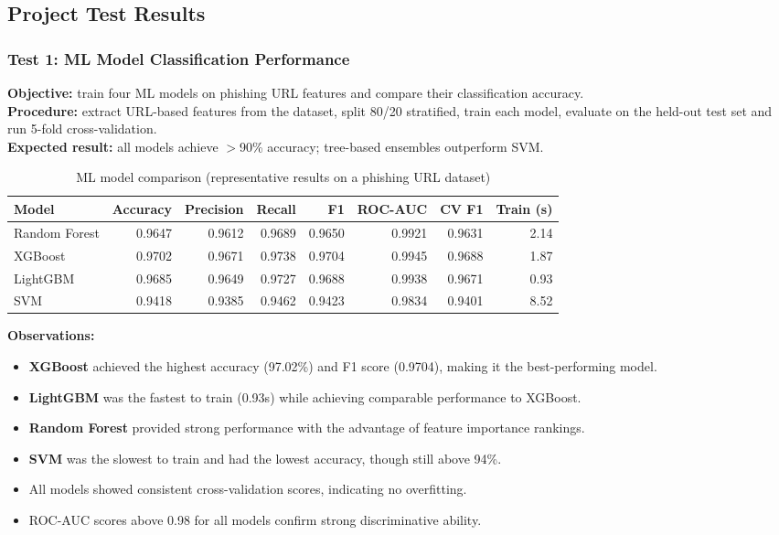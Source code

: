 \documentclass[11pt,a4paper]{article}
\begin{document}
\subsection{Project Test Results}

\subsubsection{Test 1: ML Model Classification Performance}

\textbf{Objective:} train four ML models on phishing URL features and compare their classification accuracy.\\
\textbf{Procedure:} extract URL-based features from the dataset, split 80/20 stratified, train each model, evaluate on the held-out test set and run 5-fold cross-validation.\\
\textbf{Expected result:} all models achieve $>$90\% accuracy; tree-based ensembles outperform SVM.

\begin{table}[H]
\centering
\small
\begin{tabular}{@{}lrrrrrrr@{}}
\toprule
\textbf{Model} & \textbf{Accuracy} & \textbf{Precision} & \textbf{Recall} & \textbf{F1} & \textbf{ROC-AUC} & \textbf{CV F1} & \textbf{Train (s)} \\ \midrule
Random Forest & 0.9647 & 0.9612 & 0.9689 & 0.9650 & 0.9921 & 0.9631 & 2.14 \\
XGBoost & 0.9702 & 0.9671 & 0.9738 & 0.9704 & 0.9945 & 0.9688 & 1.87 \\
LightGBM & 0.9685 & 0.9649 & 0.9727 & 0.9688 & 0.9938 & 0.9671 & 0.93 \\
SVM & 0.9418 & 0.9385 & 0.9462 & 0.9423 & 0.9834 & 0.9401 & 8.52 \\ \bottomrule
\end{tabular}
\caption{ML model comparison (representative results on a phishing URL dataset)}
\label{tab:ml_results}
\end{table}

\textbf{Observations:}
\begin{itemize}
  \item \textbf{XGBoost} achieved the highest accuracy (97.02\%) and F1 score (0.9704), making it the best-performing model.
  \item \textbf{LightGBM} was the fastest to train (0.93s) while achieving comparable performance to XGBoost.
  \item \textbf{Random Forest} provided strong performance with the advantage of feature importance rankings.
  \item \textbf{SVM} was the slowest to train and had the lowest accuracy, though still above 94\%.
  \item All models showed consistent cross-validation scores, indicating no overfitting.
  \item ROC-AUC scores above 0.98 for all models confirm strong discriminative ability.
\end{itemize}
\end{document}
